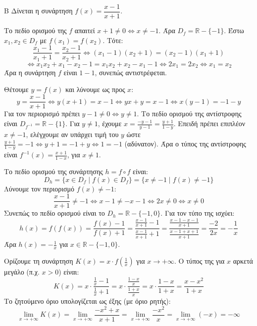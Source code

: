 \begin{thema}{Β}
Δίνεται η συνάρτηση $f(x) = \dfrac{x-1}{x+1}$.

\begin{erwthma}
\item Το πεδίο ορισμού της $f$ απαιτεί $x+1 \ne 0 \Leftrightarrow x \ne -1$. Άρα $D_f = \mathbb{R} - \{-1\}$.
Έστω $x_1, x_2 \in D_f$ με $f(x_1) = f(x_2)$. Τότε:
\[ \frac{x_1-1}{x_1+1} = \frac{x_2-1}{x_2+1} \Leftrightarrow (x_1-1)(x_2+1) = (x_2-1)(x_1+1) \]
\[ \Leftrightarrow x_1 x_2 + x_1 - x_2 - 1 = x_1 x_2 + x_2 - x_1 - 1 \Leftrightarrow 2x_1 = 2x_2 \Leftrightarrow x_1 = x_2 \]
Άρα η συνάρτηση $f$ είναι $1-1$, συνεπώς αντιστρέφεται.

\item Θέτουμε $y = f(x)$ και λύνουμε ως προς $x$:
\[ y = \frac{x-1}{x+1} \Leftrightarrow y(x+1) = x-1 \Leftrightarrow yx + y = x - 1 \Leftrightarrow x(y-1) = -1 - y \]
Για τον περιορισμό πρέπει $y-1 \ne 0 \Leftrightarrow y \ne 1$. Το πεδίο ορισμού της αντίστροφης είναι $D_{f^{-1}} = \mathbb{R} - \{1\}$.
Για $y \ne 1$, έχουμε $x = \frac{-y-1}{y-1} = \frac{y+1}{1-y}$. Επειδή πρέπει επιπλέον $x \ne -1$, ελέγχουμε αν υπάρχει τιμή του $y$ ώστε $\frac{y+1}{1-y} = -1 \Leftrightarrow y+1 = -1+y \Leftrightarrow 1 = -1$ (αδύνατον).
Άρα ο τύπος της αντίστροφης είναι $f^{-1}(x) = \frac{x+1}{1-x}$, για $x \ne 1$.

\item Το πεδίο ορισμού της συνάρτησης $h = f \circ f$ είναι:
\[ D_h = \{x \in D_f \mid f(x) \in D_f\} = \{x \ne -1 \mid f(x) \ne -1\} \]
Λύνουμε τον περιορισμό $f(x) \ne -1$:
\[ \frac{x-1}{x+1} \ne -1 \Leftrightarrow x-1 \ne -x-1 \Leftrightarrow 2x \ne 0 \Leftrightarrow x \ne 0 \]
Συνεπώς το πεδίο ορισμού είναι το $D_h = \mathbb{R} - \{-1, 0\}$.
Για τον τύπο της ισχύει:
\[ h(x) = f(f(x)) = \frac{f(x)-1}{f(x)+1} = \frac{\frac{x-1}{x+1} - 1}{\frac{x-1}{x+1} + 1} = \frac{\frac{x-1-x-1}{x+1}}{\frac{x-1+x+1}{x+1}} = \frac{-2}{2x} = -\frac{1}{x} \]
Άρα $h(x) = -\frac{1}{x}$ για $x \in \mathbb{R} - \{-1, 0\}$.

\item Ορίζουμε τη συνάρτηση $K(x) = x \cdot f\left(\frac{1}{x}\right)$ για $x \to +\infty$.
Ο τύπος της για $x$ αρκετά μεγάλο (π.χ. $x > 0$) είναι:
\[ K(x) = x \cdot \frac{\frac{1}{x}-1}{\frac{1}{x}+1} = x \cdot \frac{\frac{1-x}{x}}{\frac{1+x}{x}} = x \cdot \frac{1-x}{1+x} = \frac{x-x^2}{1+x} \]
Το ζητούμενο όριο υπολογίζεται ως έξης (με όριο ρητής):
\[ \lim_{x\to+\infty} K(x) = \lim_{x\to+\infty} \frac{-x^2+x}{x+1} = \lim_{x\to+\infty} \frac{-x^2}{x} = \lim_{x\to+\infty} (-x) = -\infty \]
\end{erwthma}
\end{thema}

